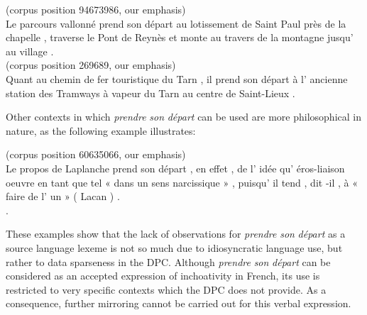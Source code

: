 \ea (corpus position 94673986, our emphasis)\label{ex:3:5}\\
Le parcours vallonné prend son départ au lotissement de Saint Paul près de la chapelle , traverse le Pont de Reynès et monte au travers de la montagne jusqu' au village .\\ 
\z
\ea (corpus position 269689, our emphasis)\label{ex:3:6}\\
Quant au chemin de fer touristique du Tarn , il prend son départ à l' ancienne station des Tramways à vapeur du Tarn au centre de Saint-Lieux .\\ 
\z

Other contexts in which \textit{prendre} \textit{son} \textit{départ} can be used are more philosophical in nature, as the following example  illustrates:

\ea(corpus position 60635066, our emphasis)\label{ex:3:7}\\
Le propos de Laplanche prend son départ , en effet , de l' idée qu' éros-liaison oeuvre en tant que tel « dans un sens narcissique » , puisqu' il tend , dit -il , à « faire de l' un » ( Lacan ) .\\.
\z

These examples show that the lack of observations for \textit{prendre} \textit{son} \textit{départ} as a source language lexeme is not so much due to idiosyncratic language use, but rather to data sparseness in the DPC. Although \textit{prendre} \textit{son} \textit{départ} can be considered as an accepted expression of inchoativity in French, its use is restricted to very specific contexts which the DPC does not provide. As a consequence, further mirroring cannot be carried out for this verbal expression.

